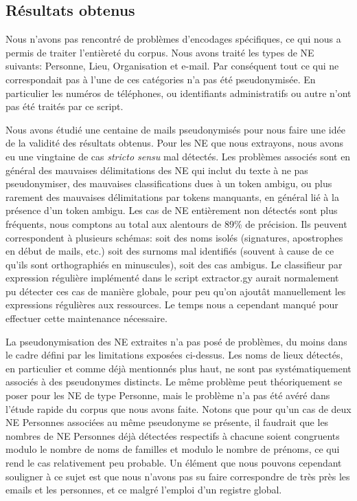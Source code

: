 \documentclass{article}
\begin{document}
\subsection{Résultats obtenus}
\par
Nous n'avons pas rencontré de problèmes d'encodages spécifiques, ce qui nous a permis de traiter l'entièreté du corpus.
Nous avons traité les types de NE suivants: Personne, Lieu, Organisation et e-mail.
Par conséquent tout ce qui ne correspondait pas à l'une de ces catégories n'a pas été pseudonymisée.
En particulier les numéros de téléphones, ou identifiants administratifs ou autre n'ont pas été traités par ce script.
\par
Nous avons étudié une centaine de mails pseudonymisés pour nous faire une idée de la validité des résultats obtenus.
Pour les NE que nous extrayons, nous avons eu une vingtaine de cas \textit{stricto sensu} mal détectés.
Les problèmes associés sont en général des mauvaises délimitations des NE qui inclut du texte à ne pas pseudonymiser, des mauvaises classifications dues à un token ambigu, ou plus rarement des mauvaises délimitations par tokens manquants, en général lié à la présence d'un token ambigu. 
Les cas de NE entièrement non détectés sont plus fréquents, nous comptons au total aux alentours de 89\% de précision.
Ils peuvent correspondent à plusieurs schémas: soit des noms isolés (signatures, apostrophes en début de mails, etc.) soit des surnoms mal identifiés (souvent à cause de ce qu'ils sont orthographiés en minuscules), soit des cas ambigus.
Le classifieur par expression régulière implémenté dans le script extractor.gy aurait normalement pu détecter ces cas de manière globale, pour peu qu'on ajoutât manuellement les expressions régulières aux ressources.
Le temps nous a cependant manqué pour effectuer cette maintenance nécessaire.
\par
La pseudonymisation des NE extraites n'a pas posé de problèmes, du moins dans le cadre défini par les limitations exposées ci-dessus.
Les noms de lieux détectés, en particulier et comme déjà mentionnés plus haut, ne sont pas systématiquement associés à des pseudonymes distincts.
Le même problème peut théoriquement se poser pour les NE de type Personne, mais le problème n'a pas été avéré dans l'étude rapide du corpus que nous avons faite.
Notons que pour qu'un cas de deux NE Personnes associées au même pseudonyme se présente, il faudrait que les nombres de NE Personnes déjà détectées respectifs à chacune soient congruents modulo le nombre de noms de familles et modulo le nombre de prénoms, ce qui rend le cas relativement peu probable.
Un élément que nous pouvons cependant souligner à ce sujet est que nous n'avons pas su faire correspondre de très près les emails et les personnes, et ce malgré l'emploi d'un registre global. 
\end{document}

